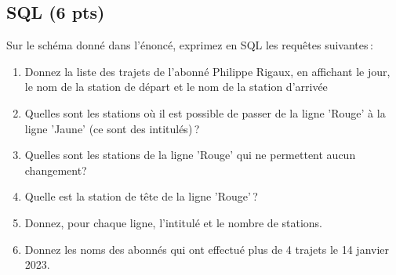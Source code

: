\subsection*{SQL (6 pts)}

Sur le schéma donné dans l'énoncé, exprimez en SQL les requêtes suivantes\,:

\begin{enumerate}
  \item Donnez la liste des trajets de l'abonné Philippe Rigaux, en affichant le jour, le nom
     de la station de départ et le nom de la station d'arrivée
  
  \item Quelles sont les stations où il est possible de passer de la ligne 'Rouge' à la ligne 'Jaune'
      (ce sont des intitulés)\,?
  
  \item Quelles sont les stations de la ligne 'Rouge' qui ne permettent aucun changement?
 
   \item Quelle est la station de tête de la ligne 'Rouge'\,?

   
   \item Donnez, pour chaque ligne, l'intitulé et le nombre de stations.
   \item Donnez les noms des abonnés qui  ont effectué plus de 4 trajets le 14 janvier 2023.
\end{enumerate}


